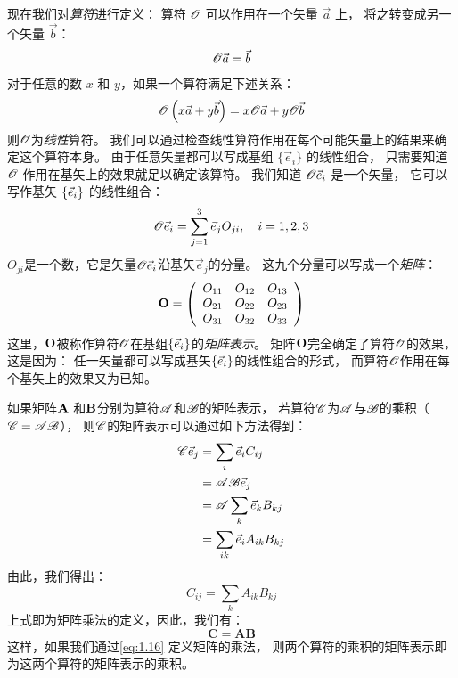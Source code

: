 现在我们对\emph{算符}进行定义：
算符 $\mathscr{O}$ 可以作用在一个矢量 $\vec{a}$ 上，
将之转变成另一个矢量 $\vec{b}$：
\begin{equation}
 \mathscr{O}\vec{a} = \vec{b}
 \label{eq:1.11}
\end{equation}
对于任意的数 $x$ 和 $y$，如果一个算符满足下述关系：
\begin{equation}
 \mathscr{O}\left(x\vec{a} + y\vec{b}\right) = x\mathscr{O}\vec{a} + y\mathscr{O}\vec{b}
 \label{eq:1.12}
\end{equation}
则$\mathscr{O}$为\emph{线性}算符。
我们可以通过检查线性算符作用在每个可能矢量上的结果来确定这个算符本身。
由于任意矢量都可以写成基组 $\{\vec{e}_i\}$ 的线性组合，
只需要知道 $\mathscr{O}$ 作用在基矢上的效果就足以确定该算符。
我们知道 $\mathscr{O}\vec{e}_i$ 是一个矢量，
它可以写作基矢 $\left\{ \vec{e}_{i} \right\}$ 的线性组合：
\begin{equation}
 \mathscr{O}\vec{e}_i = \sum_{j=1}^3 \vec{e}_j O_{ji}, \quad i = 1, 2, 3
 \label{eq:1.13}
\end{equation}
$O_{ji}$是一个数，它是矢量$\mathscr{O}\vec{e}_i$沿基矢$\vec{e}_j$的分量。
这九个分量可以写成一个\emph{矩阵}：
\begin{equation}
 \mathbf{O} = \left(
 \begin{array}{ccc}
     O_{11} &O_{12} &O_{13} \\
     O_{21} &O_{22} &O_{23} \\
     O_{31} &O_{32} &O_{33} \\
 \end{array}
 \right)
 \label{eq:1.14}
\end{equation}
这里，$\mathbf{O}$被称作算符$\mathscr{O}$在基组$\left\{ \vec{e}_{i} \right\}$的\emph{矩阵表示}。
矩阵$\mathbf{O}$完全确定了算符$\mathscr{O}$的效果，
这是因为：
任一矢量都可以写成基矢$\left\{ \vec{e}_{i} \right\}$的线性组合的形式，
而算符$\mathscr{O}$作用在每个基矢上的效果又为已知。


如果矩阵$\mathbf{A}$ 和$\mathbf{B}$分别为算符$\mathscr{A}$和$\mathscr{B}$的矩阵表示， 
若算符$\mathscr{C}$为$\mathscr{A}$与$\mathscr{B}$的乘积（$\mathscr{C} = \mathscr{A}\mathscr{B}$），
则$\mathscr{C}$的矩阵表示可以通过如下方法得到：
\begin{equation}
 \begin{split}
 \mathscr{C}\vec{e}_j &= \sum_i \vec{e}_i C_{ij} \\
 &= \mathscr{A}\mathscr{B} \vec{e}_j \\
 &= \mathscr{A}\sum_k \vec{e}_k B_{kj} \\
 &= \sum_{ik} \vec{e}_i A_{ik}B_{kj}
 \end{split} 
 \label{eq:1.15}
\end{equation}
由此，我们得出：
\begin{equation}
 C_{ij} = \sum_k A_{ik}B_{kj}
 \label{eq:1.16}
\end{equation}
上式即为矩阵乘法的定义，因此，我们有：
\begin{equation}
 \mathbf{C} = \mathbf{A}\mathbf{B}
 \label{eq:1.17}
\end{equation}
这样，如果我们通过\autoref{eq:1.16} 定义矩阵的乘法，
则两个算符的乘积的矩阵表示即为这两个算符的矩阵表示的乘积。

